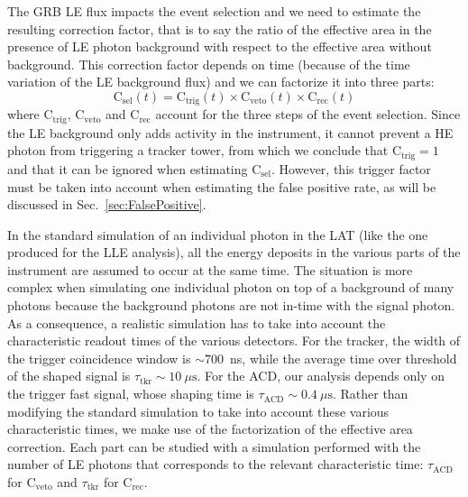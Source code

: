 \documentclass[preprint]{aastex631}
\begin{document}
The GRB LE flux impacts the event selection and we need to estimate the resulting correction factor, that is to say the ratio of the effective area in the presence of LE photon background with respect to the effective area without background. This correction factor depends on time (because of the time variation of the LE background flux) and we can factorize it into three parts:
\begin{equation} \label{eq:efficiency_correction}
\mathrm{C}_\mathrm{sel} (t) = \mathrm{C}_\mathrm{trig} (t) \times \mathrm{C}_\mathrm{veto} (t) \times \mathrm{C}_\mathrm{rec} (t)
\end{equation}
where $\mathrm{C}_\mathrm{trig}$, $\mathrm{C}_\mathrm{veto}$ and $\mathrm{C}_\mathrm{rec}$ account for the three steps of the event selection. Since the LE background only adds activity in the instrument, it cannot prevent a HE photon from triggering a tracker tower, from which we conclude that $\mathrm{C}_\mathrm{trig} = 1$ and that it can be ignored when estimating $\mathrm{C}_\mathrm{sel}$. However, this trigger factor must be taken into account when estimating the false positive rate, as will be discussed in Sec.~\ref{sec:FalsePositive}.

In the standard simulation of an individual photon in the LAT (like the one produced for the LLE analysis), all the energy deposits in the various parts of the instrument are assumed to occur at the same time. The situation is more complex when simulating one individual photon on top of a background of many photons because the background photons are not in-time with the signal photon. As a consequence, a realistic simulation has to take into account the characteristic readout times of the various detectors. For the tracker, the width of the trigger coincidence window is $\sim 700$~ns, while the average time over threshold of the shaped signal is $\tau_\mathrm{tkr}\sim 10~ \mu\mathrm{s}$. For the ACD, our analysis depends only on the trigger fast signal, whose shaping time is $\tau_\mathrm{ACD}\sim 0.4~\mu\mathrm{s}$. Rather than modifying the standard simulation to take into account these various characteristic times, we make use of the factorization of the effective area correction. Each part can be studied with a simulation performed with the number of LE photons that corresponds to the relevant characteristic time: $\tau_\mathrm{ACD}$ for $\mathrm{C}_\mathrm{veto}$ and $\tau_\mathrm{tkr}$ for $\mathrm{C}_\mathrm{rec}$.
\end{document}
